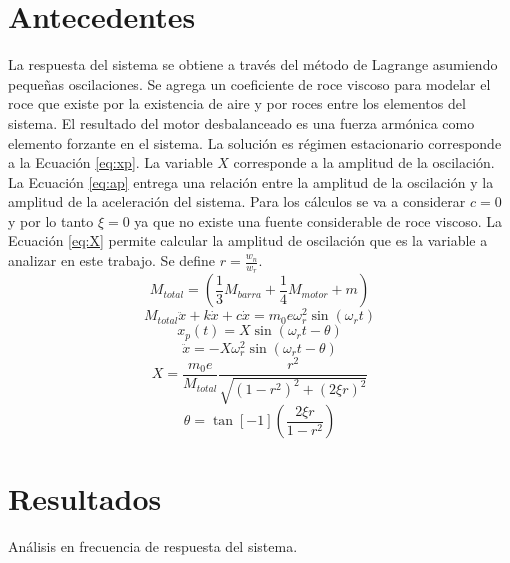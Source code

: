\documentclass[letterpaper,11pt]{article} %
\begin{document}
\section{Antecedentes}
La respuesta del sistema se obtiene a través del método de Lagrange asumiendo pequeñas oscilaciones. Se agrega un coeficiente de roce viscoso para modelar el roce que existe por la existencia de aire y por roces entre los elementos del sistema. El resultado del motor desbalanceado es una fuerza armónica como elemento forzante en el sistema. 
La solución es régimen estacionario corresponde a la Ecuación \ref{eq:xp}. La variable $X$ corresponde a la amplitud de la oscilación. La Ecuación \ref{eq:ap} entrega una relación entre la amplitud de la oscilación y la amplitud de la aceleración del sistema.
Para los cálculos se va a considerar $c=0$ y por lo tanto $\xi=0$ ya que no existe una fuente considerable de roce viscoso.  La Ecuación \ref{eq:X} permite calcular la amplitud de oscilación que es la variable a analizar en este trabajo.  Se define $r=\frac{w_n}{w_r}$.
\begin{equation}
M_{total} =\left(\frac{1}{3}M_{barra}+\frac{1}{4}M_{motor}+m\right)
\label{eq:respuesta}
\end{equation}
\begin{equation}
    M_{total}\ddot{x} + k\dot{x} + c\dot{x}= m_{0}e\omega_{r}^2\sin(\omega_{r}t)
    \label{eq:mtotal}
\end{equation}
\begin{equation}
x_p(t)=X\sin(\omega_rt-\theta)
\label{eq:xp}	
\end{equation}
\begin{equation}
\ddot{x}=-X\omega_{r}^2\sin(\omega_rt-\theta)
\label{eq:ap}
\end{equation}
\begin{equation}
	X = \frac{m_{0}e}{M_{total}}\frac{r^2}{\sqrt{(1-r^2)^2+(2\xi r)^2}}
	\label{eq:X}
\end{equation}
\begin{equation}
	\theta = \tan[-1](\frac{2\xi r}{1-r^2})
	\label{eq:teta}
\end{equation}
\section{Resultados}
\begin{images}[\label{fig:1}]{Análisis en frecuencia de respuesta del sistema.}
\end{images}
\end{document}

